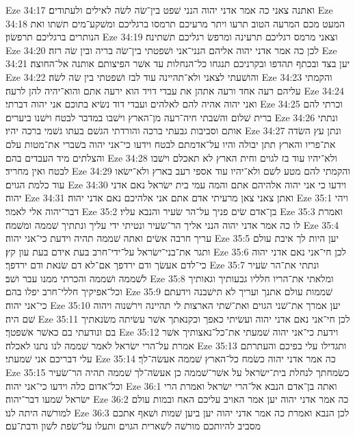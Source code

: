 Eze 34:17  ואתנה צאני כה אמר אדני יהוה הנני שׁפט בין־שׂה לשׂה לאילים ולעתודים׃
Eze 34:18  המעט מכם המרעה הטוב תרעו ויתר מרעיכם תרמסו ברגליכם ומשׁקע־מים תשׁתו ואת הנותרים ברגליכם תרפשׂון׃
Eze 34:19  וצאני מרמס רגליכם תרעינה ומרפשׂ רגליכם תשׁתינה׃
Eze 34:20  לכן כה אמר אדני יהוה אליהם הנני־אני ושׁפטתי בין־שׂה בריה ובין שׂה רזה׃
Eze 34:21  יען בצד ובכתף תהדפו ובקרניכם תנגחו כל־הנחלות עד אשׁר הפיצותם אותנה אל־החוצה׃
Eze 34:22  והושׁעתי לצאני ולא־תהיינה עוד לבז ושׁפטתי בין שׂה לשׂה׃
Eze 34:23  והקמתי עליהם רעה אחד ורעה אתהן את עבדי דויד הוא ירעה אתם והוא־יהיה להן לרעה׃
Eze 34:24  ואני יהוה אהיה להם לאלהים ועבדי דוד נשׂיא בתוכם אני יהוה דברתי׃
Eze 34:25  וכרתי להם ברית שׁלום והשׁבתי חיה־רעה מן־הארץ וישׁבו במדבר לבטח וישׁנו ביערים׃
Eze 34:26  ונתתי אותם וסביבות גבעתי ברכה והורדתי הגשׁם בעתו גשׁמי ברכה יהיו׃
Eze 34:27  ונתן עץ השׂדה את־פריו והארץ תתן יבולה והיו על־אדמתם לבטח וידעו כי־אני יהוה בשׁברי את־מטות עלם והצלתים מיד העבדים בהם׃
Eze 34:28  ולא־יהיו עוד בז לגוים וחית הארץ לא תאכלם וישׁבו לבטח ואין מחריד׃
Eze 34:29  והקמתי להם מטע לשׁם ולא־יהיו עוד אספי רעב בארץ ולא־ישׂאו עוד כלמת הגוים׃
Eze 34:30  וידעו כי אני יהוה אלהיהם אתם והמה עמי בית ישׂראל נאם אדני יהוה׃
Eze 34:31  ואתן צאני צאן מרעיתי אדם אתם אני אלהיכם נאם אדני יהוה׃
Eze 35:1  ויהי דבר־יהוה אלי לאמר׃
Eze 35:2  בן־אדם שׂים פניך על־הר שׂעיר והנבא עליו׃
Eze 35:3  ואמרת לו כה אמר אדני יהוה הנני אליך הר־שׂעיר ונטיתי ידי עליך ונתתיך שׁממה ומשׁמה׃
Eze 35:4  עריך חרבה אשׂים ואתה שׁממה תהיה וידעת כי־אני יהוה׃
Eze 35:5  יען היות לך איבת עולם ותגר את־בני־ישׂראל על־ידי־חרב בעת אידם בעת עון קץ׃
Eze 35:6  לכן חי־אני נאם אדני יהוה כי־לדם אעשׂך ודם ירדפך אם־לא דם שׂנאת ודם ירדפך׃
Eze 35:7  ונתתי את־הר שׂעיר לשׁממה ושׁממה והכרתי ממנו עבר ושׁב׃
Eze 35:8  ומלאתי את־הריו חלליו גבעותיך וגאותיך וכל־אפיקיך חללי־חרב יפלו בהם׃
Eze 35:9  שׁממות עולם אתנך ועריך לא תישׁבנה וידעתם כי־אני יהוה׃
Eze 35:10  יען אמרך את־שׁני הגוים ואת־שׁתי הארצות לי תהיינה וירשׁנוה ויהוה שׁם היה׃
Eze 35:11  לכן חי־אני נאם אדני יהוה ועשׂיתי כאפך וכקנאתך אשׁר עשׂיתה משׂנאתיך בם ונודעתי בם כאשׁר אשׁפטך׃
Eze 35:12  וידעת כי־אני יהוה שׁמעתי את־כל־נאצותיך אשׁר אמרת על־הרי ישׂראל לאמר שׁממה לנו נתנו לאכלה׃
Eze 35:13  ותגדילו עלי בפיכם והעתרתם עלי דבריכם אני שׁמעתי׃
Eze 35:14  כה אמר אדני יהוה כשׂמח כל־הארץ שׁממה אעשׂה־לך׃
Eze 35:15  כשׂמחתך לנחלת בית־ישׂראל על אשׁר־שׁממה כן אעשׂה־לך שׁממה תהיה הר־שׂעיר וכל־אדום כלה וידעו כי־אני יהוה׃
Eze 36:1  ואתה בן־אדם הנבא אל־הרי ישׂראל ואמרת הרי ישׂראל שׁמעו דבר־יהוה׃
Eze 36:2  כה אמר אדני יהוה יען אמר האויב עליכם האח ובמות עולם למורשׁה היתה לנו׃
Eze 36:3  לכן הנבא ואמרת כה אמר אדני יהוה יען ביען שׁמות ושׁאף אתכם מסביב להיותכם מורשׁה לשׁארית הגוים ותעלו על־שׂפת לשׁון ודבת־עם׃

